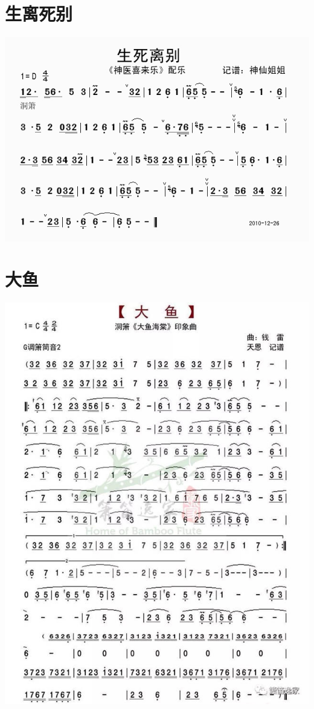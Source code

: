 \documentclass[cn,pad,chinese,chinesefont=nofont]{elegantbook}
\begin{document}
\section{生离死别}
    \includegraphics[width=\textwidth]{dongxiao/20200324生离死别.jpg} 
\section{大鱼}
    \includegraphics[width=\textwidth]{dongxiao/20200324大鱼.jpg}
\end{document}
